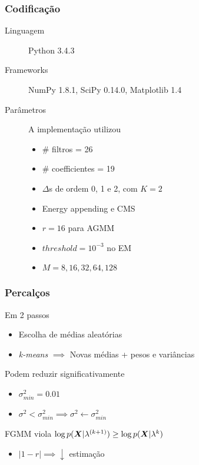 \begin{frame}
\frametitle{Codificação}
\begin{description}
    \item[Linguagem] Python 3.4.3
    \pause
    \item[Frameworks] NumPy 1.8.1, SciPy 0.14.0, Matplotlib 1.4
    \pause
    \item[Parâmetros] A implementação utilizou
    \pause
    \begin{itemize}
        \item \# filtros = 26
        \pause
        \item \# coefficientes = 19
        \pause
        \item $\Delta$s de ordem 0, 1 e 2, com $K = 2$
        \pause
        \item Energy appending e CMS
        \pause
        \item $r = 16$ para AGMM
        \pause
        \item $threshold = 10^{-3}$ no EM
        \pause
        \item $M = 8, 16, 32, 64, 128$
    \end{itemize}
\end{description}
\end{frame}

\begin{frame}
\frametitle{Percalços}
\begin{description}\itemsep6pt
    \item[Inicialização] Em 2 passos
    \pause
    \begin{itemize}
        \item Escolha de médias aleatórias
        \pause
        \item \emph{k-means} $\implies$ Novas médias + pesos e variâncias
        \pause
    \end{itemize}
    \item[Variâncias] Podem reduzir significativamente
    \pause
    \begin{itemize}\itemsep4pt
        \item $\sigma_{min}^2 = 0.01$
        \pause
        \item $\sigma^2 < \sigma_{min}^2 \implies \sigma^2 \gets \sigma_{min}^2$
        \pause
    \end{itemize}
    \item[$\overline{Monotonic}$] FGMM viola $\log p(\boldsymbol{X}|\lambda^{(k+1)}) \geq \log p(\boldsymbol{X}|\lambda^{k})$
    \pause
    \begin{itemize}\itemsep4pt
        \item $|1 - r| \implies \downarrow$ estimação
    \end{itemize}
\end{description}
\end{frame}

